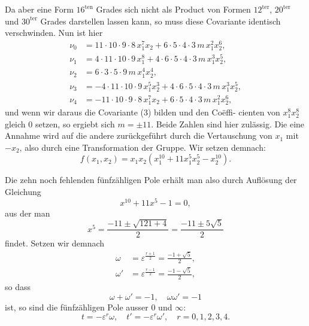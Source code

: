 \documentclass[12pt,a4paper]{article}
\theoremstyle{plain}
\theoremstyle{definition}
\theoremstyle{remark}
\begin{document}
Da aber eine Form $16^{\text{ten}}$ Grades sich nicht als Product von
Formen $12^{\text{ter}}$, $20^{\text{ter}}$ und $30^{\text{ter}}$ Grades darstellen lassen kann, so
muss diese Covariante identisch verschwinden. Nun ist hier
\begin{align*}
\nu_0 &= 11\cdot 10\cdot 9\cdot 8\,x_1^7 x_2 + 6\cdot 5\cdot 4\cdot 3\,m\,x_1^2 x_2^6,\\
\nu_1 &= 4\cdot 11\cdot 10\cdot 9\,x_1^8 + 4\cdot 6\cdot 5\cdot 4\cdot 3\,m\,x_1^3 x_2^5,\\
\nu_2 &= 6\cdot 3\cdot 5\cdot 9\,m\,x_1^4 x_2^4,\\
\nu_3 &= -4\cdot 11\cdot 10\cdot 9\,x_1^5 x_2^3 + 4\cdot 6\cdot 5\cdot 4\cdot 3\,m\,x_1^3 x_2^5,\\
\nu_4 &= -11\cdot 10\cdot 9\cdot 8\,x_1^7 x_2 + 6\cdot 5\cdot 4\cdot 3\,m\,x_1^2 x_2^6,
\end{align*}
und wenn wir daraus die Covariante (3) bilden und den Co\"effi-
cienten von $x_1^8 x_2^8$ gleich 0 setzen, so ergiebt sich $m = \pm 11$.
Beide Zahlen sind hier zul\"assig. Die eine Annahme wird auf
die andere zur\"uckgef\"uhrt durch die Vertauschung von $x_1$ mit
$-x_2$, also durch eine Transformation der Gruppe. Wir setzen
demnach:
\begin{equation}\label{eq:58_4}
f(x_1, x_2) = x_1 x_2 (x_1^{10} + 11x_1^5 x_2^5 - x_2^{10}).\tag{4}
\end{equation}

Die zehn noch fehlenden f\"unfz\"ahligen Pole erh\"alt man also
durch Aufl\"osung der Gleichung
\[
x^{10} + 11x^5 - 1 = 0,
\]
aus der man
\[
x^5 = \frac{-11 \pm \sqrt{121 + 4}}{2} = \frac{-11 \pm 5\sqrt{5}}{2}
\]
findet. Setzen wir demnach
\begin{equation}\label{eq:58_5}
\begin{aligned}
\omega &= \varepsilon^{\frac{r+1}{2}} = \frac{-1 + \sqrt{5}}{2},\\
\omega' &= \varepsilon^{\frac{r-1}{2}} = \frac{-1 - \sqrt{5}}{2},
\end{aligned}\tag{5}
\end{equation}
so dass
\begin{equation}\label{eq:58_6}
\omega + \omega' = -1,\quad \omega\omega' = -1\tag{6}
\end{equation}
ist, so sind die f\"unfz\"ahligen Pole ausser $0$ und $\infty$:
\begin{equation}\label{eq:58_7}
t = -\varepsilon^r\omega,\quad t' = -\varepsilon^r\omega',\quad r = 0, 1, 2, 3, 4.\tag{7}
\end{equation}
\end{document}
